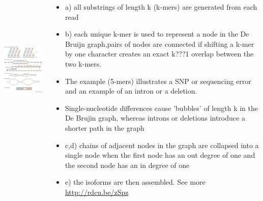 \documentclass{beamer}\usepackage[]{graphicx}\usepackage[]{color}
\begin{document}
\begin{frame}
\begin{center}
\begin{columns}
\begin{column}{0.48\textwidth}
\includegraphics[height=7cm]{Images/denovo.jpg}
\end{column}
\begin{column}{0.48\textwidth}
\begin{itemize}
  \scriptsize
  \item a) all substrings of length k (k-mers) are generated from each read
  \item b) each unique k-mer is used to represent a node in the De Bruijn graph,pairs of nodes are connected if shifting a k-mer by one character creates an exact k???1 overlap between the two k-mers. 
  \item The example (5-mers) illustrates a SNP or sequencing error and an example of an intron or a deletion. 
  \item Single-nucleotide differences cause 'bubbles' of length k in the De Brujin graph, whereas introns or deletions introduce a shorter path in the graph
  \item c,d) chains of adjacent nodes in the graph are collapsed into a single node when the first node has an out degree of one and the second node has an in degree of one
  \item e) the isoforms are then assembled. See more \href{JA Martin, Z Wang, Nature Reviews Genetics, 2011}{http://rdcu.be/zSpz}
\end{itemize}
\end{column}
\end{columns}
\end{center}
\end{frame}

\end{document}
